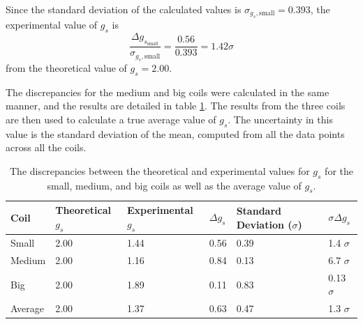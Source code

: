 \documentclass[a4paper]{article}
\begin{document}
Since the standard deviation of the calculated values is
\( \sigma_{g_s, \text{small}} = 0.393 \), the experimental value of \( g_s \) is $$
\frac{\Delta g_{s_{\text{small}}}}{\sigma_{g_s, \text{small}}} = \frac{0.56}{0.393} = 1.42
\sigma $$ from the theoretical value of $g_s = 2.00$.

\newpage

\qq The discrepancies for the medium and big coils were calculated in the same
manner, and the results are detailed in table \ref{tab:discrepancyG}. The results
from the three coils are then used to calculate a true average value of \( g_s
\). The uncertainty in this value is the standard deviation of the mean, computed from all the data
points across all the coils.

\begin{table}[H]
  \caption{The discrepancies between the theoretical and experimental values for
    \( g_s \) for the small, medium, and big coils as well as the average value
    of \( g_s \).}
  \begin{center}
    \begin{tabular}{|l|l|l|l|l|l|}
      \hline
      Coil & Theoretical \( g_s \) & Experimental \( g_s \) & \( \Delta g_s \) &
                                                                                 Standard
                                                                                 Deviation
                                                                                 (\(
                                                                                 \sigma
                                                                                 \)) &
                                                                                 \(
                                                                                 \sigma
                                                                                 \Delta
                                                                                 g_s
                                                                                 \)
      \\
      \hline
      Small & 2.00 & 1.44 & 0.56 & 0.39 & 1.4 \( \sigma \) \\
      Medium & 2.00 & 1.16 & 0.84 & 0.13 & 6.7 \( \sigma \) \\
      Big & 2.00 & 1.89 & 0.11 & 0.83 & 0.13 \( \sigma \) \\
      \hline
      Average & 2.00 & 1.37 & 0.63 & 0.47 & 1.3 \( \sigma \) \\
      \hline
    \end{tabular}
  \end{center}
  \label{tab:discrepancyG}
\end{table}
\end{document}

